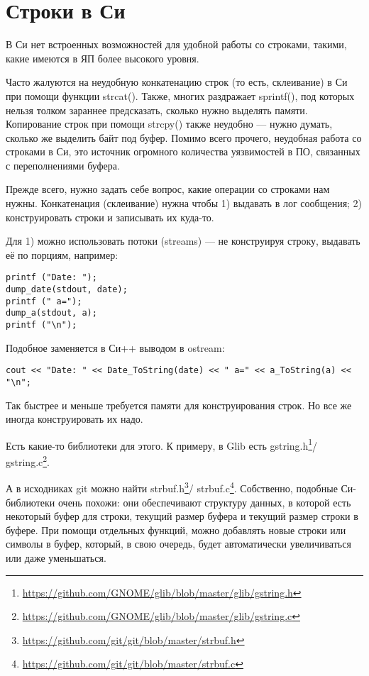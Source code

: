 \section{Строки в Си}

В Си нет встроенных возможностей для удобной работы со строками, такими, какие имеются в ЯП более
высокого уровня.

Часто жалуются на неудобную
конкатенацию строк (то есть, склеивание) в Си при помощи функции strcat(). Также, многих раздражает sprintf(),
под которых нельзя толком зараннее предсказать, сколько нужно выделять памяти. Копирование строк при помощи
strcpy() также неудобно --- нужно думать, сколько же выделить байт под буфер. Помимо всего прочего, неудобная
работа со строками в Си, это источник огромного количества уязвимостей в ПО, связанных с переполнениями буфера\cite[1.14.2]{REBook}.

Прежде всего, нужно задать себе вопрос, какие операции со строками нам нужны.
Конкатенация (склеивание) нужна чтобы 1) выдавать в лог сообщения; 2) конструировать строки и записывать их куда-то.

Для 1) можно использовать потоки (streams) --- не конструируя строку, выдавать её по порциям, например:

\begin{lstlisting}
printf ("Date: ");
dump_date(stdout, date);
printf (" a=");
dump_a(stdout, a);
printf ("\n");
\end{lstlisting}

Подобное заменяется в Си++ выводом в ostream:

\begin{lstlisting}
cout << "Date: " << Date_ToString(date) << " a=" << a_ToString(a) << "\n";
\end{lstlisting}

Так быстрее и меньше требуется памяти для конструирования строк. Но все же иногда конструировать их надо.

Есть какие-то библиотеки для этого.
К примеру, в Glib есть gstring.h\footnote{\url{https://github.com/GNOME/glib/blob/master/glib/gstring.h}}/
gstring.c\footnote{\url{https://github.com/GNOME/glib/blob/master/glib/gstring.c}}. 

А в исходниках git можно найти strbuf.h\footnote{\url{https://github.com/git/git/blob/master/strbuf.h}}/
strbuf.c\footnote{\url{https://github.com/git/git/blob/master/strbuf.c}}. Собственно,
подобные Си-библиотеки очень похожи: они обеспечивают структуру данных, в которой есть некоторый буфер для строки, текущий размер буфера
и текущий размер строки в буфере. При помощи отдельных функций, можно добавлять новые строки или символы
в буфер, который, в свою очередь, будет автоматически увеличиваться или даже уменьшаться.

